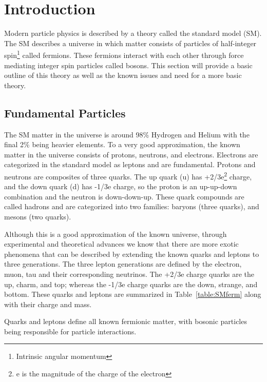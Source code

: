 \chapter{Introduction}
\label{sec:intro}
Modern particle physics is described by a theory called the standard model (SM).  
The SM describes a universe in which matter consists of particles of half-integer spin\footnote{Intrinsic angular momentum} called fermions.  
These fermions interact with each other through force mediating integer spin particles called bosons.  
This section will provide a basic outline of this theory as well as the known issues and need for a more basic theory.

\section{Fundamental Particles}
The SM matter in the universe is around 98\% Hydrogen and Helium with the final 2\% being heavier elements.  
To a very good approximation, the known matter in the universe consists of protons, neutrons, and electrons.  
Electrons are categorized in the standard model as leptons and are fundamental.  
Protons and neutrons are composites of three quarks.  
The up quark (u) has +2/3e\footnote{e is the magnitude of the charge of the electron} charge, and the down quark (d) has -1/3e charge, so the proton is an up-up-down combination and the neutron is down-down-up.  
These quark compounds are called hadrons and are categorized into two families: baryons (three quarks), and mesons (two quarks).

Although this is a good approximation of the known universe, through experimental and theoretical advances we know that there are 
more exotic phenomena that can be described by extending the known quarks and leptons to three generations.  
The three lepton generations are defined by the electron, muon, tau and their corresponding neutrinos.
The +2/3e charge quarks are the up, charm, and top; whereas the -1/3e charge quarks are the down, strange, and bottom.  
These quarks and leptons are summarized in Table~\ref{table:SMferm} along with their charge and mass.
    
Quarks and leptons define all known fermionic matter, with bosonic particles being responsible for particle interactions.
    


